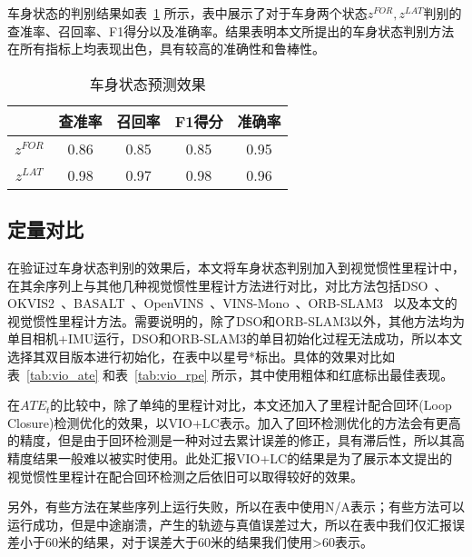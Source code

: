 车身状态的判别结果如表~\ref{tab:pose_detection} 所示，表中展示了对于车身两个状态$z^{FOR},z^{LAT}$判别的查准率、召回率、F1得分以及准确率。结果表明本文所提出的车身状态判别方法在所有指标上均表现出色，具有较高的准确性和鲁棒性。

\begin{table}
\centering
\caption{车身状态预测效果}
\begin{tabular}{ccccc}
\toprule
          & 查准率  & 召回率  & F1得分 & 准确率  \\
\midrule
$z^{FOR}$ & 0.86 & 0.85 & 0.85 & 0.95 \\
$z^{LAT}$ & 0.98 & 0.97 & 0.98 & 0.96 \\
\bottomrule
\end{tabular}
\label{tab:pose_detection}
\end{table}

\subsection{定量对比}
在验证过车身状态判别的效果后，本文将车身状态判别加入到视觉惯性里程计中，在其余序列上与其他几种视觉惯性里程计方法进行对比，对比方法包括DSO~\cite{von2018direct}、OKVIS2~\cite{leutenegger2022okvis2}、BASALT~\cite{usenko2019visual}、OpenVINS~\cite{Geneva2020ICRA}、VINS-Mono~\cite{qin2018vins}、ORB-SLAM3~\cite{campos2021orb} 以及本文的视觉惯性里程计方法。需要说明的，除了DSO和ORB-SLAM3以外，其他方法均为单目相机+IMU运行，DSO和ORB-SLAM3的单目初始化过程无法成功，所以本文选择其双目版本进行初始化，在表中以星号*标出。具体的效果对比如表~\ref{tab:vio_ate} 和表~\ref{tab:vio_rpe} 所示，其中使用粗体和红底标出最佳表现。

在$ATE_t$的比较中，除了单纯的里程计对比，本文还加入了里程计配合回环(Loop Closure)检测优化的效果，以VIO+LC表示。加入了回环检测优化的方法会有更高的精度，但是由于回环检测是一种对过去累计误差的修正，具有滞后性，所以其高精度结果一般难以被实时使用。此处汇报VIO+LC的结果是为了展示本文提出的视觉惯性里程计在配合回环检测之后依旧可以取得较好的效果。

另外，有些方法在某些序列上运行失败，所以在表中使用N/A表示；有些方法可以运行成功，但是中途崩溃，产生的轨迹与真值误差过大，所以在表中我们仅汇报误差小于60米的结果，对于误差大于60米的结果我们使用\textgreater{}60表示。

